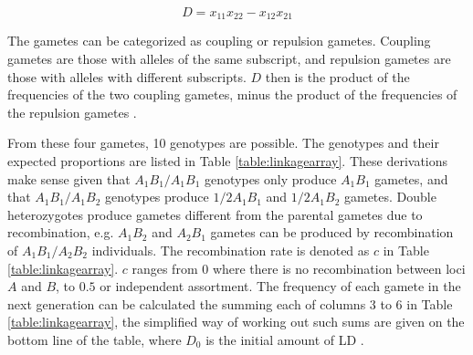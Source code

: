 \begin{equation}
D=x_{11}x_{22}-x_{12}x_{21}
\end{equation}

The gametes can be categorized as coupling or repulsion gametes.
Coupling gametes are those with alleles of the same subscript, and repulsion gametes are those with alleles with different subscripts.
$D$ then is the product of the frequencies of the two coupling gametes, minus the product of the frequencies of the repulsion gametes \parencite{Hedrick2010}.

From these four gametes, 10 genotypes are possible. The genotypes and their expected proportions are listed in Table \ref{table:linkagearray}.
These derivations make sense given that $A_1B_1/A_1B_1$ genotypes only produce $A_1B_1$ gametes, and that $A_1B_1/A_1B_2$ genotypes produce $1/2A_1B_1$ and $1/2A_1B_2$ gametes.
Double heterozygotes produce gametes different from the parental gametes due to recombination, e.g. $A_1B_2$ and $A_2B_1$ gametes can be produced by recombination of $A_1B_1/A_2B_2$ individuals.
The recombination rate is denoted as $c$ in Table \ref{table:linkagearray}.
$c$ ranges from 0 where there is no recombination between loci $A$ and $B$, to $0.5$ or independent assortment.
The frequency of each gamete in the next generation can be calculated the summing each of columns 3 to 6 in Table \ref{table:linkagearray}, the simplified way of working out such sums are given on the bottom line of the table, where $D_0$ is the initial amount of LD \parencite{Hedrick2010}.

